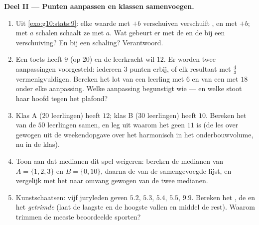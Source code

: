 \begin{problem}
\medskip
\noindent\textbf{Deel II --- Punten aanpassen en klassen samenvoegen.}
\begin{enumerate}[resume]
  \item Uit \cref{exo:g10:stats:9}: elke waarde met $+b$ verschuiven
        verschuift ,  en  met $+b$; met $a$
        schalen schaalt ze met $a$. Wat gebeurt er met de  en
        de  bij een verschuiving? En bij een schaling?
        Verantwoord.
  \item Een toets heeft  $9$ (op $20$) en de leerkracht wil
         $12$. Er worden twee aanpassingen voorgesteld: iedereen
        $3$ punten erbij, of elk resultaat met $\frac43$ vermenigvuldigen.
        Bereken het lot van een leerling met $6$ en van een met $18$ onder
        elke aanpassing. Welke aanpassing begunstigt wie --- en welke stoot
        haar hoofd tegen het plafond?
  \item Klas A ($20$ leerlingen) heeft  $12$; klas B ($30$
        leerlingen) heeft  $10$. Bereken het  van de $50$
        leerlingen samen, en leg uit waarom het geen $11$ is (de les over
        gewogen  uit de weekendopgave over het harmonisch
         in het onderbouwvolume, nu in de klas).
  \item Toon aan dat medianen dit spel weigeren: bereken de medianen van
        $A = \{1, 2, 3\}$ en $B = \{0, 10\}$, daarna de  van de
        samengevoegde lijst, en vergelijk met het naar omvang gewogen
         van de twee medianen.
  \item Kunstschaatsen: vijf juryleden geven $5.2$, $5.3$, $5.4$, $5.5$,
        $9.9$. Bereken het , de  en het \emph{getrimde
        } (laat de laagste en de hoogste vallen en middel de rest).
        Waarom trimmen de meeste beoordeelde sporten?
\end{enumerate}


\end{problem}
